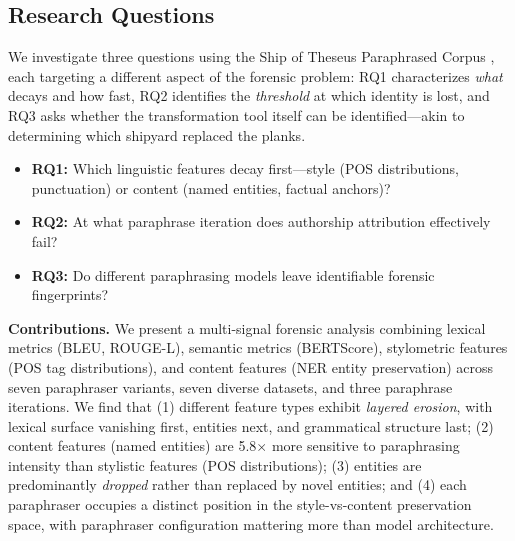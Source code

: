 \subsection{Research Questions}

We investigate three questions using the Ship of Theseus Paraphrased Corpus \cite{tripto2024ship}, each targeting a different aspect of the forensic problem: RQ1 characterizes \emph{what} decays and how fast, RQ2 identifies the \emph{threshold} at which identity is lost, and RQ3 asks whether the transformation tool itself can be identified---akin to determining which shipyard replaced the planks.

\begin{itemize}
    \item \textbf{RQ1:} Which linguistic features decay first---style (POS distributions, punctuation) or content (named entities, factual anchors)?
    \item \textbf{RQ2:} At what paraphrase iteration does authorship attribution effectively fail?
    \item \textbf{RQ3:} Do different paraphrasing models leave identifiable forensic fingerprints?
\end{itemize}

\textbf{Contributions.} We present a multi-signal forensic analysis combining lexical metrics (BLEU, ROUGE-L), semantic metrics (BERTScore), stylometric features (POS tag distributions), and content features (NER entity preservation) across seven paraphraser variants, seven diverse datasets, and three paraphrase iterations. We find that (1) different feature types exhibit \emph{layered erosion}, with lexical surface vanishing first, entities next, and grammatical structure last; (2) content features (named entities) are 5.8$\times$ more sensitive to paraphrasing intensity than stylistic features (POS distributions); (3) entities are predominantly \emph{dropped} rather than replaced by novel entities; and (4) each paraphraser occupies a distinct position in the style-vs-content preservation space, with paraphraser configuration mattering more than model architecture.
